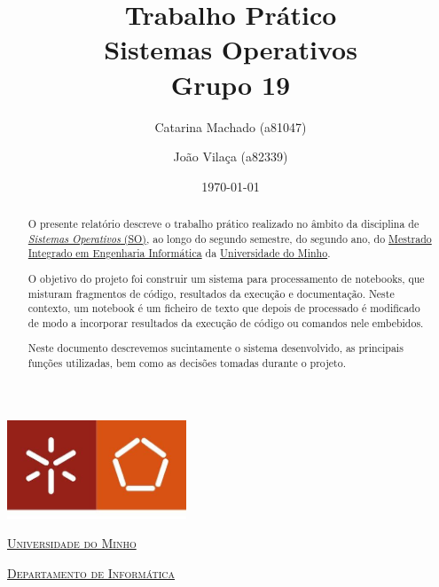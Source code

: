 \documentclass[a4paper]{article}
\begin{document}
\title{Trabalho Prático\\ Sistemas Operativos\\Grupo 19}
\author{Catarina Machado (a81047) \and João Vilaça (a82339)}
\date{\today}

\begin{titlepage}

  \thispagestyle{empty}
  \begin{center}
  \begin{minipage}{0.75\linewidth}
      \centering
      \includegraphics[width=0.4\textwidth]{imgs/eng.jpeg}\par\vspace{1cm}
      \vspace{1.5cm}
      \href{https://www.uminho.pt/PT}{\scshape\LARGE Universidade do Minho} \par
      \vspace{1cm}
      \href{https://www.di.uminho.pt/}{\scshape\Large Departamento de Informática} \par
      \vspace{1.5cm}

  \maketitle
  \end{minipage}
  \end{center}

  \clearpage

 \end{titlepage}


\begin{abstract}
O presente relatório descreve o trabalho prático realizado no âmbito da disciplina de
\href{http://miei.di.uminho.pt/plano_estudos.html#sistemas_operativos}
{\emph {Sistemas Operativos} (SO)}, ao longo do segundo semestre,
do segundo ano, do \href{http://miei.di.uminho.pt}{Mestrado Integrado em Engenharia Informática}
da \href{https://www.uminho.pt}{Universidade do Minho}.

O objetivo do projeto foi construir um sistema para processamento de notebooks,
que misturam fragmentos de código, resultados da execução e documentação.
Neste contexto, um notebook é um ficheiro de texto que depois de processado é
modificado de modo a incorporar resultados da execução de código ou comandos nele embebidos.

Neste documento descrevemos sucintamente o sistema desenvolvido, as principais
funções utilizadas, bem como as decisões tomadas durante o
projeto.

\end{abstract}
\end{document}
